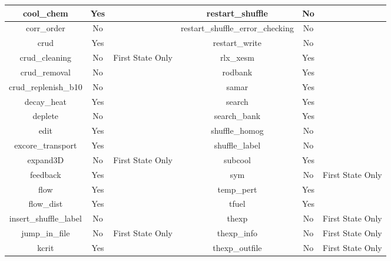 \begin{table}[h]
{\begin{tabular}{|c|c|c||c|c|c|}
cool\_chem             & Yes &                  & restart\_shuffle                  & No  &                  \\\hline
corr\_order            & No  &                  & restart\_shuffle\_error\_checking & No  &                  \\\hline
crud                   & Yes &                  & restart\_write                    & No  &                  \\\hline
crud\_cleaning         & No  & First State Only & rlx\_xesm                         & Yes &                  \\\hline
crud\_removal          & No  &                  & rodbank                           & Yes &                  \\\hline
crud\_replenish\_b10   & No  &                  & samar                             & Yes &                  \\\hline
decay\_heat            & Yes &                  & search                            & Yes &                  \\\hline
deplete                & No  &                  & search\_bank                      & Yes &                  \\\hline
edit                   & Yes &                  & shuffle\_homog                    & No  &                  \\\hline
excore\_transport      & Yes &                  & shuffle\_label                    & No  &                  \\\hline
expand3D               & No  & First State Only & subcool                           & Yes &                  \\\hline
feedback               & Yes &                  & sym                               & No  & First State Only \\\hline
flow                   & Yes &                  & temp\_pert                        & Yes &                  \\\hline
flow\_dist             & Yes &                  & tfuel                             & Yes &                  \\\hline
insert\_shuffle\_label & No  &                  & thexp                             & No  & First State Only \\\hline
jump\_in\_file         & No  & First State Only & thexp\_info                       & No  & First State Only \\\hline
kcrit                  & Yes &                  & thexp\_outfile                    & No  & First State Only \\\hline

\end{tabular}}
\end{table}
